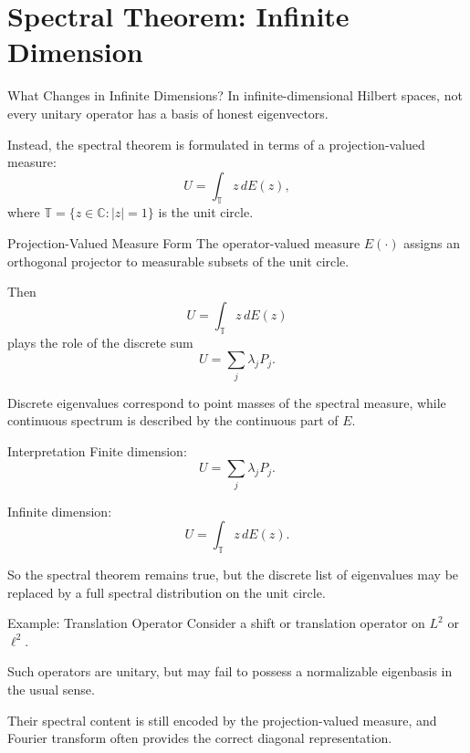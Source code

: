 \documentclass{beamer}
\begin{document}
\section{Spectral Theorem: Infinite Dimension}

\begin{frame}{What Changes in Infinite Dimensions?}
In infinite-dimensional Hilbert spaces, not every unitary operator has a basis of honest eigenvectors.

\medskip

Instead, the spectral theorem is formulated in terms of a projection-valued measure:
\[
U=\int_{\mathbb{T}} z\, dE(z),
\]
where \(\mathbb{T}=\{z\in\mathbb{C}:|z|=1\}\) is the unit circle.
\end{frame}

\begin{frame}{Projection-Valued Measure Form}
The operator-valued measure \(E(\cdot)\) assigns an orthogonal projector to measurable subsets of the unit circle.

Then
\[
U=\int_{\mathbb{T}} z\, dE(z)
\]
plays the role of the discrete sum
\[
U=\sum_j \lambda_j P_j.
\]

Discrete eigenvalues correspond to point masses of the spectral measure, while continuous spectrum is described by the continuous part of \(E\).
\end{frame}

\begin{frame}{Interpretation}
Finite dimension:
\[
U=\sum_j \lambda_j P_j.
\]

Infinite dimension:
\[
U=\int_{\mathbb{T}} z\, dE(z).
\]

So the spectral theorem remains true, but the discrete list of eigenvalues may be replaced by a full spectral distribution on the unit circle.
\end{frame}

\begin{frame}{Example: Translation Operator}
Consider a shift or translation operator on \(L^2\) or \(\ell^2\).

Such operators are unitary, but may fail to possess a normalizable eigenbasis in the usual sense.

\medskip

Their spectral content is still encoded by the projection-valued measure, and Fourier transform often provides the correct diagonal representation.
\end{frame}
\end{document}
